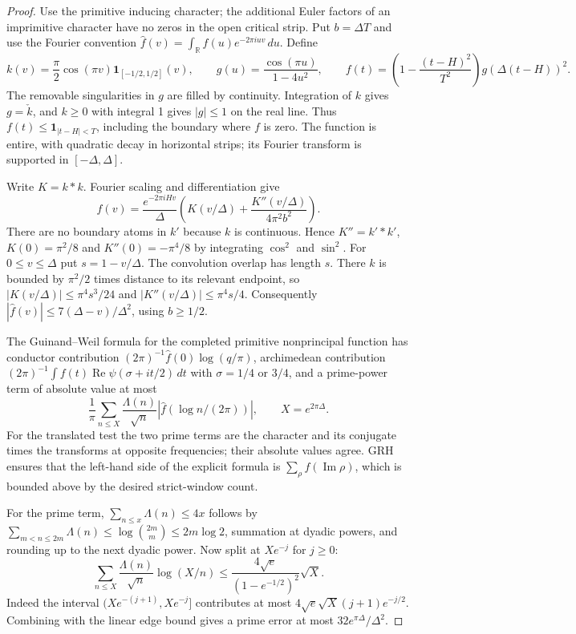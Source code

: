 \documentclass[11pt]{article}
\DeclareMathOperator{\Rea}{Re}
\begin{document}
\begin{proof}
Use the primitive inducing character; the additional Euler factors of an imprimitive
character have no zeros in the open critical strip. Put $b=\Delta T$ and use the
Fourier convention $\widehat f(v)=\int_{\mathbb R}f(u)e^{-2\pi iuv}\,du$. Define
\[
 k(v)=\frac{\pi}{2}\cos(\pi v)\mathbf 1_{[-1/2,1/2]}(v),\qquad
 g(u)=\frac{\cos(\pi u)}{1-4u^2},\qquad
 f(t)=\left(1-\frac{(t-H)^2}{T^2}\right)g(\Delta(t-H))^2.
\]
The removable singularities in $g$ are filled by continuity. Integration of $k$
gives $g=\check k$, and $k\ge0$ with integral 1 gives $|g|\le1$ on the real line.
Thus $f(t)\le\mathbf 1_{|t-H|<T}$, including the boundary where $f$ is zero.
The function is entire, with quadratic decay in horizontal strips; its
Fourier transform is supported in $[-\Delta,\Delta]$.

Write $K=k*k$. Fourier scaling and differentiation give
\[
 \widehat f(v)=\frac{e^{-2\pi i Hv}}{\Delta}
 \left(K(v/\Delta)+\frac{K''(v/\Delta)}{4\pi^2 b^2}\right).
\]
There are no boundary atoms in $k'$ because $k$ is continuous. Hence
$K''=k'*k'$, $K(0)=\pi^2/8$ and $K''(0)=-\pi^4/8$ by integrating
$\cos^2$ and $\sin^2$. For $0\le v\le\Delta$ put $s=1-v/\Delta$.
The convolution overlap has length $s$. There $k$ is bounded by
$\pi^2/2$ times distance to its relevant endpoint, so
$|K(v/\Delta)|\le \pi^4s^3/24$ and $|K''(v/\Delta)|\le \pi^4s/4$.
Consequently $|\widehat f(v)|\le 7(\Delta-v)/\Delta^2$, using $b\ge1/2$.

The Guinand--Weil formula for the completed primitive nonprincipal function
has conductor contribution $(2\pi)^{-1}\widehat f(0)\log(q/\pi)$,
archimedean contribution $(2\pi)^{-1}\int f(t)\Rea\psi(\sigma+it/2)\,dt$
with $\sigma=1/4$ or $3/4$, and a prime-power term of absolute value at most
\[
 \frac1\pi\sum_{n\le X}\frac{\Lambda(n)}{\sqrt n}
 |\widehat f(\log n/(2\pi))|,\qquad X=e^{2\pi\Delta}.
\]
For the translated test the two prime terms are the character and its conjugate
times the transforms at opposite frequencies; their absolute values agree.
GRH ensures that the left-hand side of the explicit formula is $\sum_\rho f(\operatorname{Im}\rho)$,
which is bounded above by the desired strict-window count.

For the prime term, $\sum_{n\le x}\Lambda(n)\le4x$ follows by
$\sum_{m<n\le2m}\Lambda(n)\le\log\binom{2m}{m}\le 2m\log 2$, summation at dyadic powers,
and rounding up to the next dyadic power. Now split at $Xe^{-j}$ for $j\ge0$:
\[
 \sum_{n\le X}\frac{\Lambda(n)}{\sqrt n}\log(X/n)
 \le \frac{4\sqrt e}{(1-e^{-1/2})^2}\sqrt X.
\]
Indeed the interval $(Xe^{-(j+1)},Xe^{-j}]$ contributes at most
$4\sqrt e\sqrt X(j+1)e^{-j/2}$. Combining with the linear edge bound gives a prime error
at most $32e^{\pi\Delta}/\Delta^2$.


\end{proof}
\end{document}
